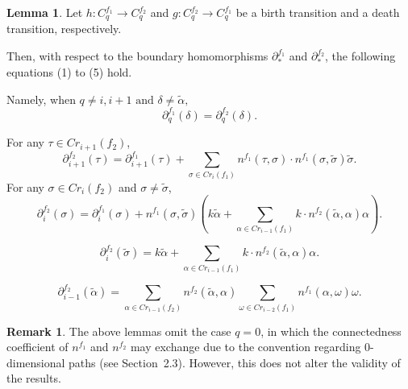 \documentclass[a4paper,12pt,notitlepage]{amsart}
\theoremstyle{definition}%
\newtheorem{lemma}[theorem]{Lemma}
\newtheorem{remark}[theorem]{Remark}
\theoremstyle{definition}%
\theoremstyle{definition}%
\begin{document}
\begin{lemma}
Let 
$h:C_q^{f_1} \to C_q^{f_2}$ and $g:C_q^{f_2} \to C_q^{f_1}$ be a birth transition and 
a death transition, 
respectively.

Then, with respect to the boundary homomorphisms 
$\partial_{\ast}^{f_1}$ and $\partial_{\ast}^{f_2}$,
the following equations (1) to (5) 
hold.


Namely, when  $ q\neq i, i+1   \text{ and } 
\delta\neq \tilde{\alpha},$
\begin{equation}\label{1}
\partial^{f_1}_q (\delta)= \partial^{f_2}_q (\delta).
\end{equation}

For any  $\tau \in Cr_{i+1}(f_2)$,
\begin{equation} \label{2}
\partial_{i+1}^{f_2}(\tau )=  \partial_{i+1}^{f_1}(\tau ) + \sum_{\sigma \in Cr_{i}(f_1)} n^{f_1} (\tau, \sigma)\cdot n^{f_1}(\sigma, \tilde{\sigma})  \tilde{\sigma}.
\end{equation}
 For any $\sigma \in Cr_{i}(f_2)$ and $\sigma \neq \tilde{\sigma}$,
 \begin{equation} \label{3}
\partial_{i}^{f_2}(\sigma )=\partial_i^{f_1}(\sigma) + n^{f_1}(\sigma, \tilde{\sigma})   (k \tilde{\alpha} + \sum_{\alpha \in Cr_{i-1}(f_1)   }    k \cdot n^{f_2} (\tilde{\alpha}, \alpha   )  \alpha     ).
\end{equation}

 \begin{equation} \label{4}
 \partial_{i}^{f_2}(\tilde{\sigma })=  k \tilde{\alpha}  +   \sum_{\alpha \in Cr_{i-1}(f_1)}  k\cdot n^{f_2} (\tilde{\alpha},  \alpha) \alpha  .
\end{equation}

 \begin{equation} \label{5}
  \partial_{i-1}^{f_2}(\tilde{\alpha })= \sum_{\alpha \in Cr_{i-1}(f_2)} n^{f_2} (\tilde{\alpha}, \alpha)   \sum_{\omega \in Cr_{i-2} (f_1) }n^{f_1} (\alpha, \omega) \omega.
 \end{equation}
\end{lemma}




\begin{remark}
The above lemmas 
omit the case $q=0$,
in which  the connectedness coefficient of $n^{f_1}$ and $n^{f_2}$ may 
exchange due to the convention regarding $0$-dimensional paths (see Section~2.3). 
However, this does not alter the validity of the results.
\end{remark}
\end{document}
